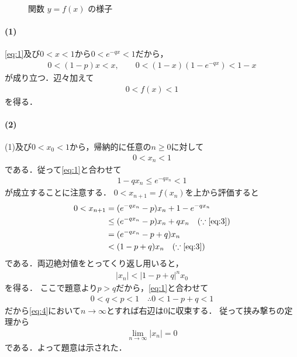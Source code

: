 \documentclass[../../main.tex]{subfiles}
\begin{document}
\begin{figure}[htb]
  \caption{関数 $y=f(x)$ の様子}
  \label{fig:fx_overview_unit_square}
\end{figure}

\paragraph{(1)}

\cref{eq:1}及び$0<x<1$から$0<e^{-qx}<1$だから，
\begin{align}
  0<(1-p)x<x,\qquad 0<(1-x)(1-e^{-qx})<1-x
\end{align}
が成り立つ．辺々加えて
\begin{align}
  0<f(x)<1
\end{align}
を得る．

\paragraph{(2)}

(1)及び$0<x_0<1$から，帰納的に任意の$n\ge0$に対して
\begin{align}
  0<x_n<1 \label{eq:2}
\end{align}
である．従って\cref{eq:1}と合わせて
\begin{align}
  1-qx_n \le e^{-qx_n} < 1 \label{eq:3}
\end{align}
が成立することに注意する．
$0<x_{n+1}=f(x_n)$を上から評価すると
\begin{align}
  0 < x_{n+1}
  &=(e^{-qx_n}-p)x_n+1-e^{-qx_n}\\
  &\le(e^{-qx_n}-p)x_n+qx_n \quad (\because\text{\cref{eq:3}}) \\
  &=(e^{-qx_n}-p+q)x_n\\
  &<(1-p+q)x_n \quad (\because\text{\cref{eq:3}})
\end{align}
である．両辺絶対値をとってくり返し用いると，
\begin{align}
  |x_n|<|1-p+q|^nx_0 \label{eq:4}
\end{align}
を得る．
ここで題意より$p>q$だから，\cref{eq:1}と合わせて
\begin{align}
  0<q<p<1 \quad \therefore 0 < 1-p+q < 1
\end{align}
だから\cref{eq:4}において$n\to\infty$とすれば右辺は$0$に収束する．
従って挟み撃ちの定理から
\begin{align}
  \lim_{n\to\infty} |x_n| = 0
\end{align}
である．よって題意は示された．
\end{document}
